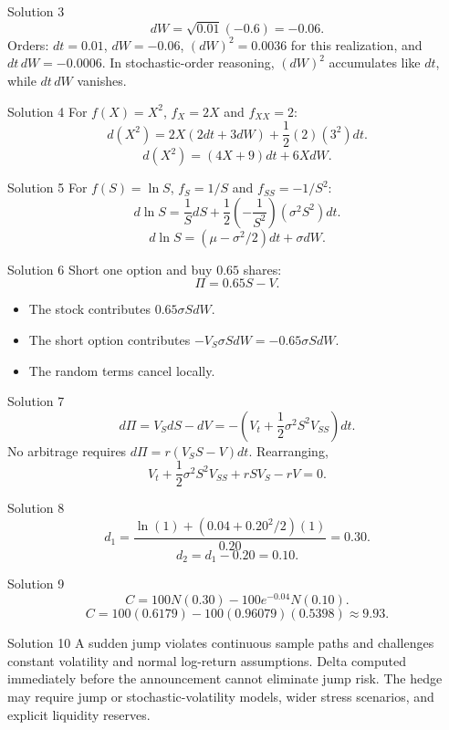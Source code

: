 \documentclass[aspectratio=169]{beamer}
\begin{document}
\begin{frame}[t]{Solution 3}
\justifying
\[dW=\sqrt{0.01}(-0.6)=\boxed{-0.06}.\]
Orders: $dt=0.01$, $dW=-0.06$, $(dW)^2=0.0036$ for this realization, and $dt\,dW=-0.0006$. In stochastic-order reasoning, $(dW)^2$ accumulates like $dt$, while $dt\,dW$ vanishes.
\end{frame}

\begin{frame}[t]{Solution 4}
\justifying
For $f(X)=X^2$, $f_X=2X$ and $f_{XX}=2$:
\[d(X^2)=2X(2dt+3dW)+\frac12(2)(3^2)dt.\]
\[\boxed{d(X^2)=(4X+9)dt+6X dW}.\]
\end{frame}

\begin{frame}[t]{Solution 5}
\justifying
For $f(S)=\ln S$, $f_S=1/S$ and $f_{SS}=-1/S^2$:
\[d\ln S=\frac1S dS+\frac12\left(-\frac1{S^2}\right)(\sigma^2S^2)dt.\]
\[\boxed{d\ln S=(\mu-\sigma^2/2)dt+\sigma dW}.\]
\end{frame}

\begin{frame}[t]{Solution 6}
\justifying
Short one option and buy $0.65$ shares:
\[\Pi=0.65S-V.\]
\begin{itemize}
\item The stock contributes $0.65\sigma S dW$.
\item The short option contributes $-V_S\sigma S dW=-0.65\sigma S dW$.
\item The random terms cancel locally.
\end{itemize}
\end{frame}

\begin{frame}[t]{Solution 7}
\justifying
\[d\Pi=V_SdS-dV=-\left(V_t+\frac12\sigma^2S^2V_{SS}\right)dt.\]
No arbitrage requires $d\Pi=r(V_SS-V)dt$. Rearranging,
\[\boxed{V_t+\frac12\sigma^2S^2V_{SS}+rSV_S-rV=0}.\]
\end{frame}

\begin{frame}[t]{Solution 8}
\justifying
\[d_1=\frac{\ln(1)+(0.04+0.20^2/2)(1)}{0.20}=\boxed{0.30}.\]
\[d_2=d_1-0.20=\boxed{0.10}.\]
\end{frame}

\begin{frame}[t]{Solution 9}
\justifying
\[C=100N(0.30)-100e^{-0.04}N(0.10).\]
\[C=100(0.6179)-100(0.96079)(0.5398)\approx\boxed{9.93}.\]
\end{frame}

\begin{frame}[t]{Solution 10}
\justifying
A sudden jump violates continuous sample paths and challenges constant volatility and normal log-return assumptions. Delta computed immediately before the announcement cannot eliminate jump risk. The hedge may require jump or stochastic-volatility models, wider stress scenarios, and explicit liquidity reserves.
\end{frame}
\end{document}
